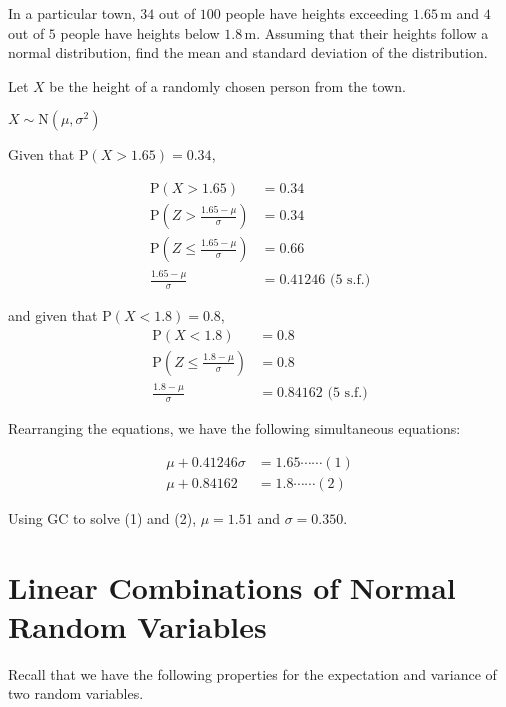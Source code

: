 \documentclass[11pt,a4paper]{book}
\begin{document}
\begin{example}

In a particular town, $34$ out of $100$ people have heights exceeding
$1.65\,\text{m}$ and $4$ out of $5$ people have heights below $1.8\,\text{m}$.
Assuming that their heights follow a normal distribution, find the
mean and standard deviation of the distribution. 

\Solution

Let $X$ be the height of a randomly chosen person from the town.

$X\sim\text{N}\left(\mu,\sigma^{2}\right)$

Given that $\text{P}\left(X>1.65\right)=0.34$, 

\begin{align*}
\text{P}\left(X>1.65\right) & =0.34\\
\text{P}\left(Z>\frac{1.65-\mu}{\sigma}\right) & =0.34\\
\text{P}\left(Z\leq\frac{1.65-\mu}{\sigma}\right) & =0.66\\
\frac{1.65-\mu}{\sigma} & =0.41246\text{ (5 s.f.)}
\end{align*}

and given that $\text{P}\left(X<1.8\right)=0.8$, 
\begin{align*}
\text{P}\left(X<1.8\right) & =0.8\\
\text{P}\left(Z\leq\frac{1.8-\mu}{\sigma}\right) & =0.8\\
\frac{1.8-\mu}{\sigma} & =0.84162\text{ (5 s.f.)}
\end{align*}

Rearranging the equations, we have the following simultaneous equations:

\begin{align*}
\mu+0.41246\sigma & =1.65\cdots\cdots(1)\\
\mu+0.84162 & =1.8\cdots\cdots(2)
\end{align*}

Using GC to solve (1) and (2), $\mu=1.51$ and $\sigma=0.350$.

\end{example}

\newpage

\section{Linear Combinations of Normal Random Variables}

Recall that we have the following properties for the expectation and
variance of two random variables.
\end{document}
